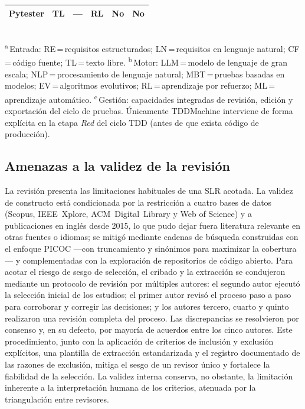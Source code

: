 \documentclass[10pt,journal,twoside,letterpaper]{IEEEtran}
\begin{document}
\begin{table}[!t]
\begin{tabular}{@{}lccccc@{}}
			Pytester \cite{takerngsaksiri2025pytester}  & TL & ---   & RL    & No   & No \\
			\bottomrule
		\end{tabular}
		\\[3pt]
		{\footnotesize \textsuperscript{a}\,Entrada: RE\,=\,requisitos estructurados; LN\,=\,requisitos en lenguaje natural; CF\,=\,código fuente; TL\,=\,texto libre. \textsuperscript{b}\,Motor: LLM\,=\,modelo de lenguaje de gran escala; NLP\,=\,procesamiento de lenguaje natural; MBT\,=\,pruebas basadas en modelos; EV\,=\,algoritmos evolutivos; RL\,=\,aprendizaje por refuerzo; ML\,=\,aprendizaje automático. \textsuperscript{c}\,Gestión: capacidades integradas de revisión, edición y exportación del ciclo de pruebas. Únicamente TDDMachine interviene de forma explícita en la etapa \emph{Red} del ciclo TDD (antes de que exista código de producción).}
	\end{table}
	
	\subsection{Amenazas a la validez de la revisión}
	\label{subsec:amenazas}
	
	La revisión presenta las limitaciones habituales de una SLR acotada. La validez de constructo está condicionada por la restricción a cuatro bases de datos (Scopus, IEEE~Xplore, ACM~Digital~Library y Web of Science) y a publicaciones en inglés desde 2015, lo que pudo dejar fuera literatura relevante en otras fuentes o idiomas; se mitigó mediante cadenas de búsqueda construidas con el enfoque PICOC ---con truncamiento y sinónimos para maximizar la cobertura--- y complementadas con la exploración de repositorios de código abierto. Para acotar el riesgo de sesgo de selección, el cribado y la extracción se condujeron mediante un protocolo de revisión por múltiples autores: el segundo autor ejecutó la selección inicial de los estudios; el primer autor revisó el proceso paso a paso para corroborar y corregir las decisiones; y los autores tercero, cuarto y quinto realizaron una revisión completa del proceso. Las discrepancias se resolvieron por consenso y, en su defecto, por mayoría de acuerdos entre los cinco autores. Este procedimiento, junto con la aplicación de criterios de inclusión y exclusión explícitos, una plantilla de extracción estandarizada y el registro documentado de las razones de exclusión, mitiga el sesgo de un revisor único y fortalece la fiabilidad de la selección. La validez interna conserva, no obstante, la limitación inherente a la interpretación humana de los criterios, atenuada por la triangulación entre revisores.
	
\end{document}
